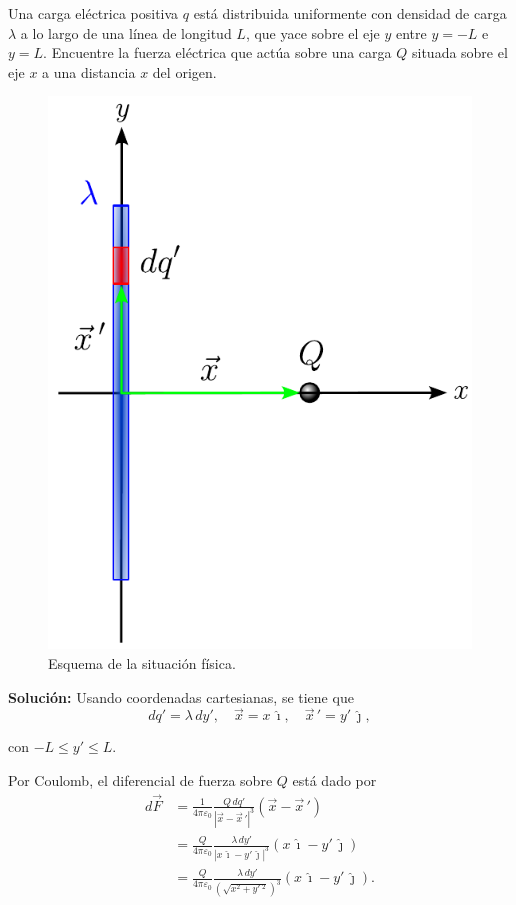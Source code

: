 \begin{ejemplo}
    Una carga eléctrica positiva $q$ está distribuida uniformente con densidad de carga $\lambda $ a lo largo de una línea de longitud $L$, que yace sobre el eje $y$ entre $y=-L$ e $y=L$. Encuentre la fuerza eléctrica que actúa sobre una carga $Q$ situada sobre el eje $x$ a una distancia $x$ del origen.

\begin{figure}[H]
    \centering
    \includegraphics[scale = 0.6]{Figuras/Ej-Distribucion-Carga-1.pdf}
    \caption{Esquema de la situación física.}
    \label{fig:Ej-Distri-Carga-1}
\end{figure}

\textbf{Solución:} Usando coordenadas cartesianas, se tiene que
$$dq' = \lambda \,dy', \quad \Vec{x} = x \, \hat{\imath}, \quad \Vec{x}\,' = y' \,\hat{\jmath},$$

con $-L \leq y' \leq L$.

Por Coulomb, el diferencial de fuerza sobre $Q$ está dado por
\begin{align*}
    d\Vec{F} &= \frac{1}{4\pi \varepsilon_0}  \frac{Q \,dq'}{|\Vec{x} - \Vec{x}\,'|^3}(\Vec{x} - \Vec{x}\,') \\
    &= \frac{Q}{4\pi \varepsilon_0}  \frac{\lambda \,dy'}{|x \, \hat{\imath} - y' \,\hat{\jmath}|^3} (x \, \hat{\imath} - y' \,\hat{\jmath}) \\
    &= \frac{Q}{4\pi \varepsilon_0}  \frac{\lambda \,dy'}{(\sqrt{x^2 + y'\,^2})^3} (x \, \hat{\imath} - y' \,\hat{\jmath}).
\end{align*}


\end{ejemplo}

